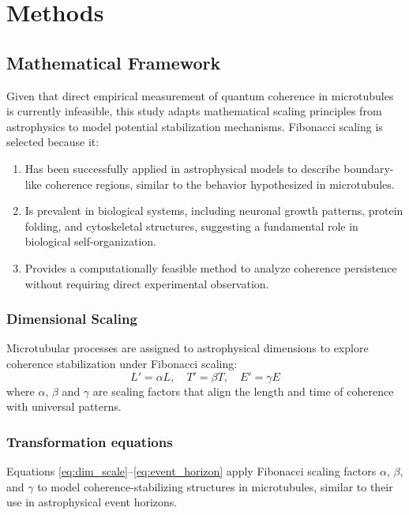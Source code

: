 \section{Methods}
\subsection{Mathematical Framework}
Given that direct empirical measurement of quantum coherence in microtubules is currently infeasible, this study adapts mathematical scaling principles from astrophysics to model potential stabilization mechanisms. Fibonacci scaling is selected because it:
\begin{enumerate}
    \item Has been successfully applied in astrophysical models to describe boundary-like coherence regions, similar to the behavior hypothesized in microtubules.
    \item Is prevalent in biological systems, including neuronal growth patterns, protein folding, and cytoskeletal structures, suggesting a fundamental role in biological self-organization.
    \item Provides a computationally feasible method to analyze coherence persistence without requiring direct experimental observation.
\end{enumerate}

\subsubsection{Dimensional Scaling}
Microtubular processes are assigned to astrophysical dimensions to explore coherence stabilization under Fibonacci scaling: 
\begin{equation}
    L' = \alpha L, \quad T' = \beta T, \quad E' = \gamma E
\label{eq:dim_scale} 
\end{equation} 
where $\alpha$, $\beta$ and $\gamma$ are scaling factors that align the length and time of coherence with universal patterns.

\subsubsection{Transformation equations} 
Equations \ref{eq:dim_scale}--\ref{eq:event_horizon} apply Fibonacci scaling factors $\alpha$, $\beta$, and $\gamma$ to model coherence-stabilizing structures in microtubules, similar to their use in astrophysical event horizons.

